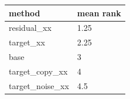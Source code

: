 \begin{tabular}{ll}
\toprule
method & mean rank \\
\midrule
residual\_xx & 1.25 \\
target\_xx & 2.25 \\
base & 3 \\
target\_copy\_xx & 4 \\
target\_noise\_xx & 4.5 \\
\bottomrule
\end{tabular}
